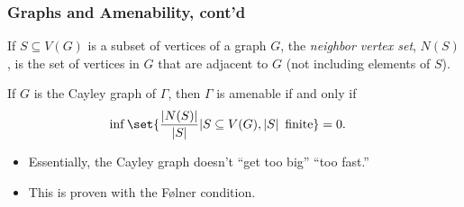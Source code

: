 \documentclass{beamer-custom}
\begin{document}
\begin{frame}
  \frametitle{Graphs and Amenability, cont'd}
  If $S\subseteq V(G)$ is a subset of vertices of a graph $G$, the \textit{neighbor vertex set}, $N(S)$, is the set of vertices in $G$ that are adjacent to $G$ (not including elements of $S$).\newline

  If $G$ is the Cayley graph of $\Gamma$, then $\Gamma$ is amenable if and only if
  \begin{align*}
    \inf\set{\frac{\left\vert N(S) \right\vert}{\left\vert S \right\vert} | S\subseteq V(G),\left\vert S \right\vert\text{ finite}} &= 0.
  \end{align*}
  \begin{itemize}
    \item Essentially, the Cayley graph doesn't ``get too big'' ``too fast.''
    \item This is proven with the Følner condition.
  \end{itemize}
\end{frame}
\end{document}
